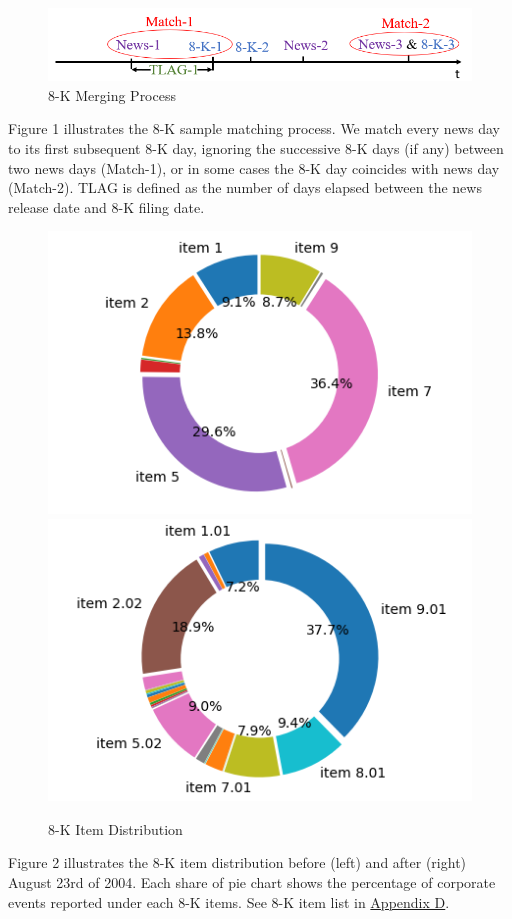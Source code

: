 \begin{figure}
	\caption{8-K Merging Process} \label{fig1}
	\begin{center}
		\includegraphics[scale=0.6]{../output/fig/fig1_matching.png}
	\end{center}
\end{figure}

Figure 1 illustrates the 8-K sample matching process. We match every news day to its first subsequent 8-K day, ignoring the successive 8-K days (if any) between two news days (Match-1), or in some cases the 8-K day coincides with news day (Match-2). TLAG is defined as the number of days elapsed between the news release date and 8-K filing date.

\begin{figure}[htbp]
	\begin{center}
		\caption{8-K Item Distribution} \label{fig2}
		\includegraphics[scale=0.5]{../output/fig/fig2_8-K_before.png}
		\includegraphics[scale=0.5]{../output/fig/fig2_8-K_after.png}
	\end{center}
\end{figure}

Figure 2 illustrates the 8-K item distribution before (left) and after (right) August 23rd of 2004. Each share of pie chart shows the percentage of corporate events reported under each 8-K items. See 8-K item list in \hyperref[appd]{Appendix D}.
